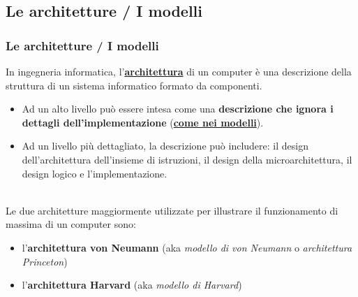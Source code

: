 \subsection[Le architetture / I modelli]{Le architetture / I modelli}
\begin{frame}
	\frametitle{Le architetture / I modelli}
	
	
		In ingegneria informatica, l'\underline{\textbf{architettura}} di un computer è una descrizione della struttura di un sistema informatico formato da componenti.
		\begin{itemize}
			\item Ad un alto livello può essere intesa come una \textbf{descrizione che ignora i dettagli dell'implementazione} (\underline{\textbf{come nei modelli}}).
			\item Ad un livello più dettagliato, la descrizione può includere: il design dell'architettura dell'insieme di istruzioni, il design della microarchitettura, il design logico e l'implementazione.
		\end{itemize}
		~\\
		\pause
		Le due architetture maggiormente utilizzate per illustrare il funzionamento di massima di un computer sono:
		\begin{itemize}
			\item l'\textbf{architettura von Neumann} (aka \textit{modello di von Neumann} o \textit{architettura Princeton})
			\item l'\textbf{architettura Harvard} (aka \textit{modello di Harvard})
		\end{itemize}
	
\end{frame}

